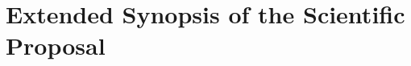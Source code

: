 \documentclass[COG,11pt]{ercgrant}
\begin{document}
\maketitle

\begin{mdframed}

\end{mdframed}



\section{Extended Synopsis of the Scientific Proposal}
\end{document}
